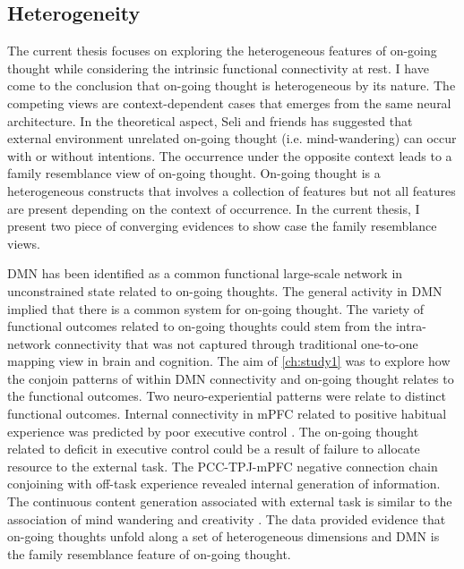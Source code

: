 \subsection{Heterogeneity}
The current thesis focuses on exploring the heterogeneous features of on-going thought while considering the intrinsic functional connectivity at rest. I have come to the conclusion that on-going thought is heterogeneous by its nature. The competing views are context-dependent cases that emerges from the same neural architecture. In the theoretical aspect, Seli and friends \cite{Seli2018,SeliTiCS2016} has suggested that external environment unrelated on-going thought (i.e. mind-wandering) can occur with or without intentions. The occurrence under the opposite context leads to a family resemblance view of on-going thought. On-going thought is a heterogeneous constructs that involves a collection of features but not all features are present depending on the context of occurrence. In the current thesis, I present two piece of converging evidences to show case the family resemblance views.

DMN has been identified as a common functional large-scale network in unconstrained state related to on-going thoughts. The general activity in DMN implied that there is a common system for on-going thought. The variety of functional outcomes related to on-going thoughts could stem from the intra-network connectivity that was not captured through traditional one-to-one mapping view in brain and cognition. The aim of \cref{ch:study1} 
was to explore how the conjoin patterns of within DMN connectivity and on-going thought relates to the functional outcomes. Two neuro-experiential patterns were relate to distinct functional outcomes. Internal connectivity in mPFC related to positive habitual experience was predicted by poor executive control \cite{McVay2009}. The on-going thought related to deficit in executive control could be a result of failure to allocate resource to the external task. The PCC-TPJ-mPFC negative connection chain conjoining with off-task experience revealed internal generation of information. The continuous content generation associated with external task is similar to the association of mind wandering and creativity \cite{Baird2012}. The data provided evidence that on-going thoughts unfold along a set of heterogeneous dimensions and DMN is the family resemblance feature of on-going thought.

